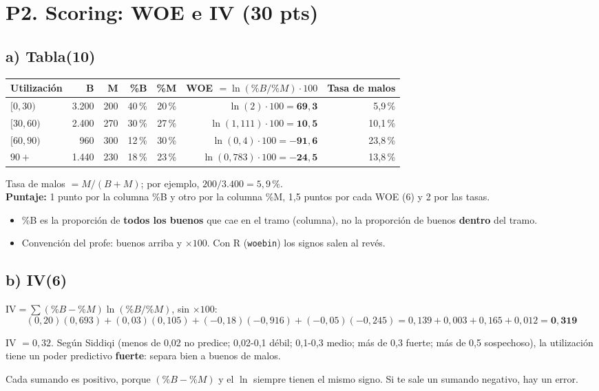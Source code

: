 \documentclass[11pt,a4paper]{article}
\newcommand{\sub}[2]{\subsection*{#1\hfill{\normalsize\textbf{(#2)}}}}
\begin{document}
\section*{P2. Scoring: WOE e IV (30 pts)}

\sub{a) Tabla}{10}
\begin{center}\small
\renewcommand{\arraystretch}{1.2}
\begin{tabular}{lrrrrrr}\toprule
Utilización & B & M & \%B & \%M & WOE $=\ln(\%B/\%M)\cdot100$ & Tasa de malos\\\midrule
$[0,30)$ & 3.200 & 200 & 40\,\% & 20\,\% & $\ln(2)\cdot100=\mathbf{69{,}3}$ & 5,9\,\%\\
$[30,60)$ & 2.400 & 270 & 30\,\% & 27\,\% & $\ln(1{,}111)\cdot100=\mathbf{10{,}5}$ & 10,1\,\%\\
$[60,90)$ & 960 & 300 & 12\,\% & 30\,\% & $\ln(0{,}4)\cdot100=\mathbf{-91{,}6}$ & 23,8\,\%\\
$90+$ & 1.440 & 230 & 18\,\% & 23\,\% & $\ln(0{,}783)\cdot100=\mathbf{-24{,}5}$ & 13,8\,\%\\\bottomrule
\end{tabular}
\end{center}
Tasa de malos $=M/(B+M)$; por ejemplo, $200/3.400=5{,}9\,\%$.\\
\textbf{Puntaje:} 1 punto por la columna \%B y otro por la columna \%M, 1,5 puntos por cada WOE (6) y 2 por las tasas.
\begin{trampa}
\begin{itemize}[leftmargin=*,itemsep=0pt,topsep=0pt]
\item \%B es la proporción de \textbf{todos los buenos} que cae en el tramo (columna), no la proporción de buenos \textbf{dentro} del tramo.
\item Convención del profe: buenos arriba y $\times100$. Con R (\texttt{woebin}) los signos salen al revés.
\end{itemize}
\end{trampa}

\sub{b) IV}{6}
$\text{IV}=\sum(\%B-\%M)\ln(\%B/\%M)$, sin $\times100$:
\[
(0{,}20)(0{,}693)+(0{,}03)(0{,}105)+(-0{,}18)(-0{,}916)+(-0{,}05)(-0{,}245)=0{,}139+0{,}003+0{,}165+0{,}012=\mathbf{0{,}319}
\]
\begin{ejemplar}
IV $=0{,}32$. Según Siddiqi (menos de 0,02 no predice; 0,02-0,1 débil; 0,1-0,3 medio; más de 0,3 fuerte; más de 0,5 sospechoso), la utilización tiene un poder predictivo \textbf{fuerte}: separa bien a buenos de malos.
\end{ejemplar}
\begin{trampa}
Cada sumando es positivo, porque $(\%B-\%M)$ y el $\ln$ siempre tienen el mismo signo. Si te sale un sumando negativo, hay un error.
\end{trampa}
\end{document}
